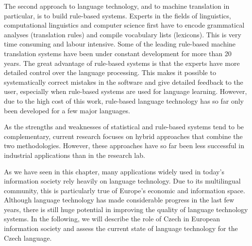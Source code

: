 \documentclass[]{../../metanetpaper}
\begin{document}
\begin{multicols}{2}
The second approach to language technology, and to machine translation in particular, is to build rule-based systems. Experts in the fields of linguistics, computational linguistics and computer science first have to encode grammatical analyses (translation rules) and compile vocabulary lists (lexicons). This is very time consuming and labour intensive. Some of the leading rule-based machine translation systems have been under constant development for more than 20 years. The great advantage of rule-based systems is that the experts have more detailed control over the language processing. This makes it possible to systematically correct mistakes in the software and give detailed feedback to the user, especially when rule-based systems are used for language learning. However, due to the high cost of this work, rule-based language technology has so far only been developed for a few major languages.

As the strengths and weaknesses of statistical and rule-based systems tend to be complementary, current research focuses on hybrid approaches that combine the two methodologies. However, these approaches have so far been less successful in industrial applications than in the research lab.

As we have seen in this chapter, many applications widely used in today’s information society rely heavily on language technology. Due to its multilingual community, this is particularly true of Europe’s economic and information space. Although language technology has made considerable progress in the last few years, there is still huge potential in improving the quality of language technology systems. In the following, we will describe the role of Czech in European information society and assess the current state of language technology for the Czech language.
\end{multicols}
\clearpage
\end{document}
